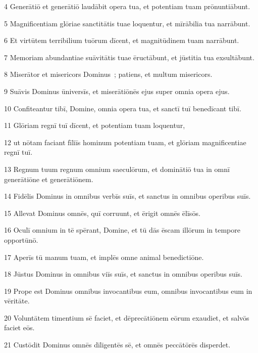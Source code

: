 \psalmVerse
  {\phantom{00}4}
  {Generātiō et generātiō laudābit opera tua, et potentiam tuam prōnuntiābunt.}


\psalmVerse
  {\phantom{00}5}
  {Magnificentiam glōriae sanctitātis tuae loquentur, et mīrābilia tua narrābunt.}


\psalmVerse
  {\phantom{00}6}
  {Et virtūtem terribilium tuōrum dīcent, et magnitūdinem tuam narrābunt.}


\psalmVerse
  {\phantom{00}7}
  {Memoriam abundantiae suāvitātis tuae ēructābunt, et jūstitia tua exsultābunt.}


\psalmVerse
  {\phantom{00}8}
  {Miserātor et misericors Dominus~; patiens, et multum misericors.}


\psalmVerse
  {\phantom{00}9}
  {Suāvis Dominus ūniversīs, et miserātiōnēs ejus super omnia opera ejus.}


\psalmVerse
  {\phantom{0}10}
  {Confiteantur tibī, Domine, omnia opera tua, et sanctī tuī benedīcant tibī.}


\psalmVerse
  {\phantom{0}11}
  {Glōriam regnī tuī dīcent, et potentiam tuam loquentur,}


\psalmVerse
  {\phantom{0}12}
  {ut nōtam faciant fīliīs hominum potentiam tuam, et glōriam magnificentiae regnī tuī.}


\psalmVerse
  {\phantom{0}13}
  {Regnum tuum regnum omnium saeculōrum, et dominātiō tua in omnī generātiōne et generātiōnem.}


\psalmVerse
  {\phantom{0}14}
  {Fidēlis Dominus in omnibus verbīs suīs, et sanctus in omnibus operibus suīs.}


\psalmVerse
  {\phantom{0}15}
  {Allevat Dominus omnēs, quī corruunt, et ērigit omnēs ēlīsōs.}


\psalmVerse
  {\phantom{0}16}
  {Oculī omnium in tē spērant, Domine, et tū dās ēscam illōrum in tempore opportūnō.}


\psalmVerse
  {\phantom{0}17}
  {Aperīs tū manum tuam, et implēs omne animal benedictiōne.}


\psalmVerse
  {\phantom{0}18}
  {Jūstus Dominus in omnibus viīs suīs, et sanctus in omnibus operibus suīs.}


\psalmVerse
  {\phantom{0}19}
  {Prope est Dominus omnibus invocantibus eum, omnibus invocantibus eum in vēritāte.}


\psalmVerse
  {\phantom{0}20}
  {Voluntātem timentium sē faciet, et dēprecātiōnem eōrum exaudiet, et salvōs faciet eōs.}


\psalmVerse
  {\phantom{0}21}
  {Custōdit Dominus omnēs dīligentēs sē, et omnēs peccātōrēs disperdet.}


